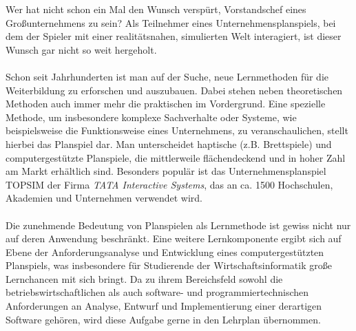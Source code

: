 Wer hat nicht schon ein Mal den Wunsch verspürt, Vorstandschef eines Großunternehmens zu sein? 
Als Teilnehmer eines Unternehmensplanspiels, bei dem der Spieler mit  einer realitätsnahen, simulierten Welt interagiert, ist dieser Wunsch gar nicht so weit hergeholt. 
\\
\\
Schon seit Jahrhunderten ist man auf der Suche, neue Lernmethoden für die Weiterbildung zu erforschen und auszubauen. Dabei stehen neben theoretischen Methoden auch immer mehr die praktischen im Vordergrund.  Eine spezielle Methode, um insbesondere komplexe Sachverhalte oder Systeme, wie beispielsweise die Funktionsweise eines Unternehmens, zu veranschaulichen, stellt hierbei das Planspiel dar. Man unterscheidet haptische (z.B. Brettspiele) und computergestützte Planspiele, die mittlerweile flächendeckend und in hoher Zahl am Markt erhältlich sind. Besonders populär ist das Unternehmensplanspiel TOPSIM der Firma \textit{TATA Interactive Systems}, das an ca. 1500 Hochschulen, Akademien und Unternehmen verwendet wird.
\\
\\
Die zunehmende Bedeutung von Planspielen als Lernmethode ist gewiss nicht nur auf deren Anwendung beschränkt. Eine weitere Lernkomponente ergibt sich auf Ebene der Anforderungsanalyse und Entwicklung eines computergestützten Planspiels, was insbesondere für Studierende der Wirtschaftsinformatik große Lernchancen mit sich bringt. Da zu ihrem Bereichsfeld sowohl die betriebswirtschaftlichen als auch software- und programmiertechnischen Anforderungen an Analyse, Entwurf und Implementierung einer derartigen Software gehören, wird diese Aufgabe gerne in den Lehrplan übernommen. 